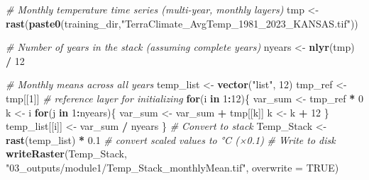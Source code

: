 \documentclass[
  10pt,
  b5paper,
  oneside]{book}
\newenvironment{Shaded}{\begin{snugshade}}{\end{snugshade}}
\newcommand{\AttributeTok}[1]{\textcolor[rgb]{0.13,0.29,0.53}{#1}}
\newcommand{\CommentTok}[1]{\textcolor[rgb]{0.56,0.35,0.01}{\textit{#1}}}
\newcommand{\ConstantTok}[1]{\textcolor[rgb]{0.56,0.35,0.01}{#1}}
\newcommand{\ControlFlowTok}[1]{\textcolor[rgb]{0.13,0.29,0.53}{\textbf{#1}}}
\newcommand{\DecValTok}[1]{\textcolor[rgb]{0.00,0.00,0.81}{#1}}
\newcommand{\FloatTok}[1]{\textcolor[rgb]{0.00,0.00,0.81}{#1}}
\newcommand{\FunctionTok}[1]{\textcolor[rgb]{0.13,0.29,0.53}{\textbf{#1}}}
\newcommand{\NormalTok}[1]{#1}
\newcommand{\OtherTok}[1]{\textcolor[rgb]{0.56,0.35,0.01}{#1}}
\newcommand{\SpecialCharTok}[1]{\textcolor[rgb]{0.81,0.36,0.00}{\textbf{#1}}}
\newcommand{\StringTok}[1]{\textcolor[rgb]{0.31,0.60,0.02}{#1}}
\begin{document}
\begin{Shaded}
\begin{Highlighting}[]
\CommentTok{\# Monthly temperature time series (multi{-}year, monthly layers)}
\NormalTok{tmp }\OtherTok{\textless{}{-}} \FunctionTok{rast}\NormalTok{(}\FunctionTok{paste0}\NormalTok{(training\_dir,}\StringTok{"TerraClimate\_AvgTemp\_1981\_2023\_KANSAS.tif"}\NormalTok{))}

\CommentTok{\# Number of years in the stack (assuming complete years)}
\NormalTok{nyears }\OtherTok{\textless{}{-}} \FunctionTok{nlyr}\NormalTok{(tmp) }\SpecialCharTok{/} \DecValTok{12}

\CommentTok{\# Monthly means across all years}
\NormalTok{temp\_list }\OtherTok{\textless{}{-}} \FunctionTok{vector}\NormalTok{(}\StringTok{"list"}\NormalTok{, }\DecValTok{12}\NormalTok{)}
\NormalTok{tmp\_ref }\OtherTok{\textless{}{-}}\NormalTok{ tmp[[}\DecValTok{1}\NormalTok{]]  }\CommentTok{\# reference layer for initializing}
\ControlFlowTok{for}\NormalTok{(i }\ControlFlowTok{in} \DecValTok{1}\SpecialCharTok{:}\DecValTok{12}\NormalTok{)\{}
\NormalTok{  var\_sum }\OtherTok{\textless{}{-}}\NormalTok{ tmp\_ref }\SpecialCharTok{*} \DecValTok{0}
\NormalTok{  k }\OtherTok{\textless{}{-}}\NormalTok{ i}
  \ControlFlowTok{for}\NormalTok{(j }\ControlFlowTok{in} \DecValTok{1}\SpecialCharTok{:}\NormalTok{nyears)\{}
\NormalTok{    var\_sum }\OtherTok{\textless{}{-}}\NormalTok{ var\_sum }\SpecialCharTok{+}\NormalTok{ tmp[[k]]}
\NormalTok{    k }\OtherTok{\textless{}{-}}\NormalTok{ k }\SpecialCharTok{+} \DecValTok{12}
\NormalTok{  \}}
\NormalTok{  temp\_list[[i]] }\OtherTok{\textless{}{-}}\NormalTok{ var\_sum }\SpecialCharTok{/}\NormalTok{ nyears}
\NormalTok{\}}
\CommentTok{\# Convert to stack}
\NormalTok{Temp\_Stack }\OtherTok{\textless{}{-}} \FunctionTok{rast}\NormalTok{(temp\_list) }\SpecialCharTok{*} \FloatTok{0.1}  \CommentTok{\# convert scaled values to °C (×0.1)}
\CommentTok{\# Write to disk}
\FunctionTok{writeRaster}\NormalTok{(Temp\_Stack, }\StringTok{"03\_outputs/module1/Temp\_Stack\_monthlyMean.tif"}\NormalTok{, }\AttributeTok{overwrite =} \ConstantTok{TRUE}\NormalTok{)}



\end{Highlighting}
\end{Shaded}
\end{document}
